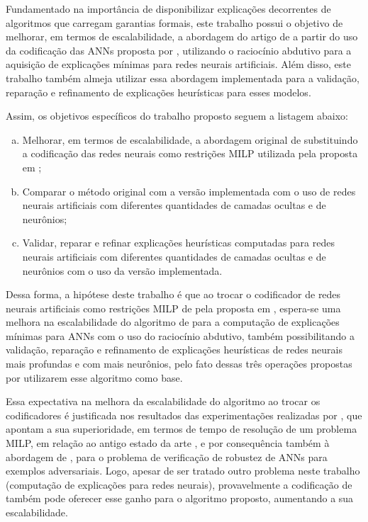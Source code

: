 Fundamentado na importância de disponibilizar explicações decorrentes de algoritmos que carregam garantias formais, este trabalho possui o objetivo de melhorar, em termos de escalabilidade, a abordagem do artigo de  a partir do uso da codificação das ANNs proposta por , utilizando o raciocínio abdutivo para a aquisição de explicações mínimas para redes neurais artificiais. Além disso, este trabalho também almeja utilizar essa abordagem implementada para a validação, reparação e refinamento de explicações heurísticas para esses modelos.


Assim, os objetivos específicos do trabalho proposto seguem a listagem abaixo:
\begin{enumerate}[a)]
    \item Melhorar, em termos de escalabilidade, a abordagem original de  substituindo a codificação das redes neurais como restrições MILP utilizada pela proposta em ;
    \item Comparar o método original com a versão implementada com o uso de redes neurais artificiais com diferentes quantidades de camadas ocultas e de neurônios;
    \item Validar, reparar e refinar explicações heurísticas computadas para redes neurais artificiais com diferentes quantidades de camadas ocultas e de neurônios com o uso da versão implementada.
\end{enumerate}

Dessa forma, a hipótese deste trabalho é que ao trocar o codificador de redes neurais artificiais como restrições MILP de  pela proposta em , espera-se uma melhora na escalabilidade do algoritmo de  para a computação de explicações mínimas para ANNs com o uso do raciocínio abdutivo, também possibilitando a validação, reparação e refinamento de explicações heurísticas de redes neurais mais profundas e com mais neurônios, pelo fato dessas três operações propostas por  utilizarem esse algoritmo como base. 

Essa expectativa na melhora da escalabilidade do algoritmo ao trocar os codificadores é justificada nos resultados das experimentações realizadas por , que apontam a sua superioridade, em termos de tempo de resolução de um problema MILP, em relação ao antigo estado da arte \cite{reluplex}, e por consequência também à abordagem de , para o problema de verificação de robustez de ANNs para exemplos adversariais. Logo, apesar de ser tratado outro problema neste trabalho (computação de explicações para redes neurais), provavelmente a codificação de  também pode oferecer esse ganho para o algoritmo proposto, aumentando a sua escalabilidade.

